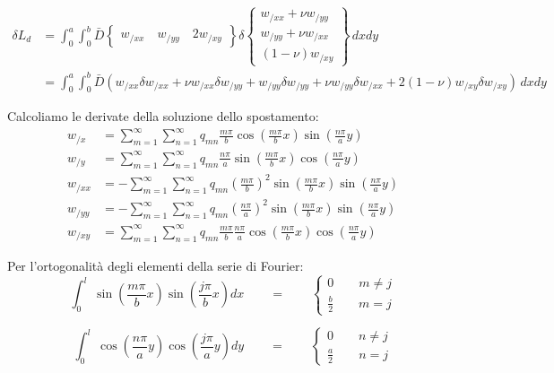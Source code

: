 \begin{align*}
    \delta L_d&=\int_0^a\int_0^b \bar{D} \begin{Bmatrix}
        w_{/xx} \quad  w_{/yy}\quad 2w_{/xy}
    \end{Bmatrix}\delta \begin{Bmatrix}
        w_{/xx}+\nu w_{/yy} \\  w_{/yy}+\nu w_{/xx}\\ (1-\nu)w_{/xy}
    \end{Bmatrix}
    \,dx dy\\
    &=\int_0^a\int_0^b \bar{D} \left( w_{/xx} \delta w_{/xx} + \nu w_{/xx} \delta w_{/yy} + w_{/yy} \delta w_{/yy} + \nu w_{/yy} \delta w_{/xx} + 2(1-\nu)w_{/xy} \delta w_{/xy} \right) \,dx dy
\end{align*}

Calcoliamo le derivate della soluzione dello spostamento:
\begin{align*}
    w_{/x} &= \sum^\infty_{m=1} \sum^\infty_{n=1} q_{mn}\frac{m\pi}{b}\cos\left(\frac{m\pi}{b}x\right) \sin\left(\frac{n\pi}{a}y\right) \\
    w_{/y} &= \sum^\infty_{m=1} \sum^\infty_{n=1} q_{mn}\frac{n\pi}{a}\sin\left(\frac{m\pi}{b}x\right) \cos\left(\frac{n\pi}{a}y\right) \\
    w_{/xx} &= -\sum^\infty_{m=1} \sum^\infty_{n=1} q_{mn}\left(\frac{m\pi}{b}\right)^2\sin\left(\frac{m\pi}{b}x\right) \sin\left(\frac{n\pi}{a}y\right) \\
    w_{/yy} &= -\sum^\infty_{m=1} \sum^\infty_{n=1} q_{mn}\left(\frac{n\pi}{a}\right)^2\sin\left(\frac{m\pi}{b}x\right) \sin\left(\frac{n\pi}{a}y\right) \\
    w_{/xy} &= \sum^\infty_{m=1} \sum^\infty_{n=1} q_{mn}\frac{m\pi}{b}\frac{n\pi}{a}\cos\left(\frac{m\pi}{b}x\right) \cos\left(\frac{n\pi}{a}y\right)
\end{align*}

Per l'ortogonalità degli elementi della serie di Fourier:
\begin{equation*}
\int_0^l \,\sin{\left(\frac{m\pi}{b}x\right)} \sin{\left(\frac{j\pi}{b}x\right)}dx \qquad=\qquad
\begin{cases}
    0\qquad m\neq j\\
    \frac{b}{2} \qquad m=j
\end{cases}
\end{equation*}

\begin{equation*}
\int_0^l \,\cos{\left(\frac{n\pi}{a}y\right)} \cos{\left(\frac{j\pi}{a}y\right)}dy \qquad=\qquad
\begin{cases}
    0\qquad n\neq j\\
    \frac{a}{2} \qquad n=j
\end{cases}
\end{equation*}

